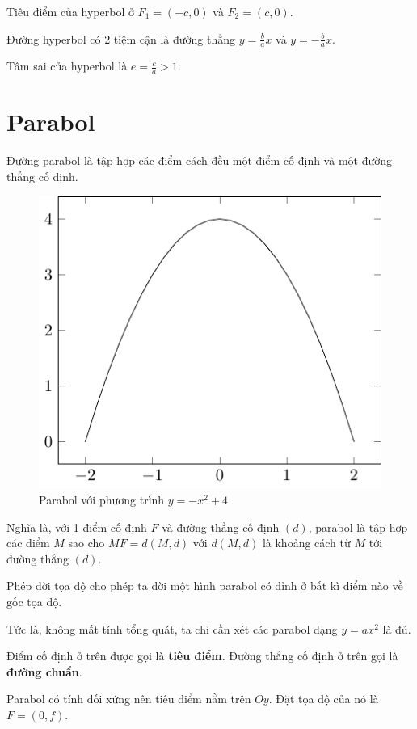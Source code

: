 Tiêu điểm của hyperbol ở $F_1 = (-c, 0)$ và $F_2 = (c, 0)$.

Đường hyperbol có 2 tiệm cận là đường thẳng $y = \frac{b}{a} x$ và $y = -\frac{b}{a} x$.

Tâm sai của hyperbol là $e = \frac{c}{a} > 1$.

\section{Parabol}

\begin{definition}[Parabol]
    Đường parabol là tập hợp các điểm cách đều một điểm cố định và một đường thẳng cố định.
\end{definition}

\begin{figure}[ht]
    \centering
    \includegraphics{../pics/conics/parabola.pdf}
    \caption{Parabol với phương trình $y = -x^2 + 4$}
\end{figure}

Nghĩa là, với 1 điểm cố định $F$ và đường thẳng cố định $(d)$, parabol là tập hợp các điểm $M$ sao cho $MF = d(M, d)$ với $d(M, d)$ là khoảng cách từ $M$ tới đường thẳng $(d)$.

Phép dời tọa độ cho phép ta dời một hình parabol có đỉnh ở bất kì điểm nào về gốc tọa độ.

Tức là, không mất tính tổng quát, ta chỉ cần xét các parabol dạng $y=ax^2$ là đủ.

Điểm cố định ở trên được gọi là \textbf{tiêu điểm}. Đường thẳng cố định ở trên gọi là \textbf{đường chuẩn}.

Parabol có tính đối xứng nên tiêu điểm nằm trên $Oy$. Đặt tọa độ của nó là $F = (0, f)$.

